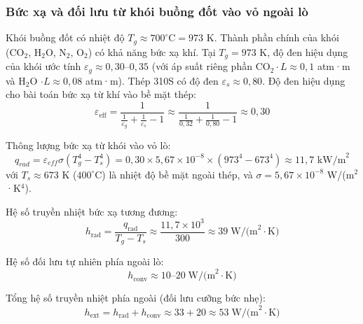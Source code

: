 \documentclass[../main.tex]{subfiles}
\begin{document}
\subsubsection{Bức xạ và đối lưu từ khói buồng đốt vào vỏ ngoài lò}
\label{sec:buc-xa-va-doi-luu-tu-khoi-buong-dot-vao-vo-ngoai-lo}

Khói buồng đốt có nhiệt độ $T_g \approx 700^\circ\mathrm{C} = 973$ K. Thành phần chính của khói (CO$_2$, H$_2$O, N$_2$, O$_2$) có khả năng bức xạ khí. Tại $T_g = 973$ K, độ đen hiệu dụng của khói ước tính $\varepsilon_g \approx 0{,}30$--$0{,}35$ (với áp suất riêng phần CO$_2 \cdot L \approx 0{,}1$ atm·m và H$_2$O $\cdot L \approx 0{,}08$ atm·m). Thép 310S có độ đen $\varepsilon_s \approx 0{,}80$. Độ đen hiệu dụng cho bài toán bức xạ từ khí vào bề mặt thép:
\begin{equation}
  \varepsilon_{\text{eff}} = \frac{1}{\frac{1}{\varepsilon_g} + \frac{1}{\varepsilon_s} - 1}
  \approx \frac{1}{\frac{1}{0{,}32} + \frac{1}{0{,}80} - 1}
  \approx 0{,}30
\end{equation}

Thông lượng bức xạ từ khói vào vỏ lò:
\begin{equation}
q_{rad} = \varepsilon_{eff} \sigma \left( T_g^4 - T_s^4 \right) = 0{,}30 \times 5{,}67 \times 10^{-8} \times \left( 973^4 - 673^4 \right) \approx 11{,}7 \text{ kW/m}^2
\label{eq:radiation-flux}
\end{equation}
với $T_s \approx 673$ K ($400^\circ$C) là nhiệt độ bề mặt ngoài thép, và $\sigma = 5{,}67 \times 10^{-8}$ W/(m$^2$·K$^4$).

Hệ số truyền nhiệt bức xạ tương đương:
\begin{equation}
  h_{\text{rad}} = \frac{q_{\text{rad}}}{T_g - T_s}
  \approx \frac{11{,}7 \times 10^3}{300} \approx 39 \;\text{W/(m}^2\cdot\text{K)}
  \label{eq:hrad}
\end{equation}

Hệ số đối lưu tự nhiên phía ngoài lò:
\begin{equation}
  h_{\text{conv}} \approx 10 \text{--}20 \;\text{W/(m}^2\cdot\text{K)}
\end{equation}

Tổng hệ số truyền nhiệt phía ngoài (đối lưu cưỡng bức nhẹ):
\begin{equation}
  h_{\text{ext}} = h_{\text{rad}} + h_{\text{conv}}
  \approx 33 + 20 \approx 53 \;\text{W/(m}^2\cdot\text{K)}
  \label{eq:hext}
\end{equation}
\end{document}
